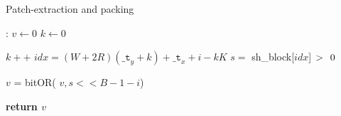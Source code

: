 \documentclass[conference,compsoc]{IEEEtran}
\newcommand{\response}[1]{\textcolor{darkgreen}{#1}}
\newcommand{\prosaic}[1]{#1}
\newcommand{\expendable}[1]{\textcolor{blue}{\textit{ Exclusively Expendable (#1)}}}
\begin{document}
 


\begin{algorithm}
\caption{Patch-extraction and packing}\label{}
\begin{algorithmic}[1]
:
\State  $v \gets 0$
\State $k  \gets 0$

\State			$k++$
\EndIf
\State		$idx =(W+2R)(\texttt{\_t}_y + k) +\texttt{\_t}_x + i -kK$
\State		$s =$ sh\_block[$idx$]$\hspace{1.5mm}>\hspace{1.5mm}0$

\State		$v$ = bitOR( $v, s << B - 1 - i$)
\EndFor

\State \textbf{return $v$}
\EndFunction
\end{algorithmic}
\end{algorithm}


\end{document}
